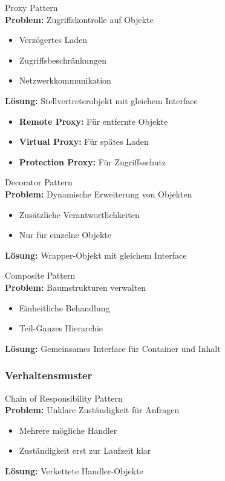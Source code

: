 \begin{definition}{Proxy Pattern}\\
\textbf{Problem:} Zugriffskontrolle auf Objekte
\begin{itemize}
    \item Verzögertes Laden
    \item Zugriffsbeschränkungen
    \item Netzwerkkommunikation
\end{itemize}
\textbf{Lösung:} Stellvertreterobjekt mit gleichem Interface
\begin{itemize}
    \item \textbf{Remote Proxy:} Für entfernte Objekte
    \item \textbf{Virtual Proxy:} Für spätes Laden
    \item \textbf{Protection Proxy:} Für Zugriffsschutz
\end{itemize}
\end{definition}

\begin{definition}{Decorator Pattern}\\
\textbf{Problem:} Dynamische Erweiterung von Objekten
\begin{itemize}
    \item Zusätzliche Verantwortlichkeiten
    \item Nur für einzelne Objekte
\end{itemize}
\textbf{Lösung:} Wrapper-Objekt mit gleichem Interface
\end{definition}

\begin{definition}{Composite Pattern}\\
\textbf{Problem:} Baumstrukturen verwalten
\begin{itemize}
    \item Einheitliche Behandlung
    \item Teil-Ganzes Hierarchie
\end{itemize}
\textbf{Lösung:} Gemeinsames Interface für Container und Inhalt
\end{definition}

\subsubsection{Verhaltensmuster}

\begin{definition}{Chain of Responsibility Pattern}\\
\textbf{Problem:} Unklare Zuständigkeit für Anfragen
\begin{itemize}
    \item Mehrere mögliche Handler
    \item Zuständigkeit erst zur Laufzeit klar
\end{itemize}
\textbf{Lösung:} Verkettete Handler-Objekte
\end{definition}

